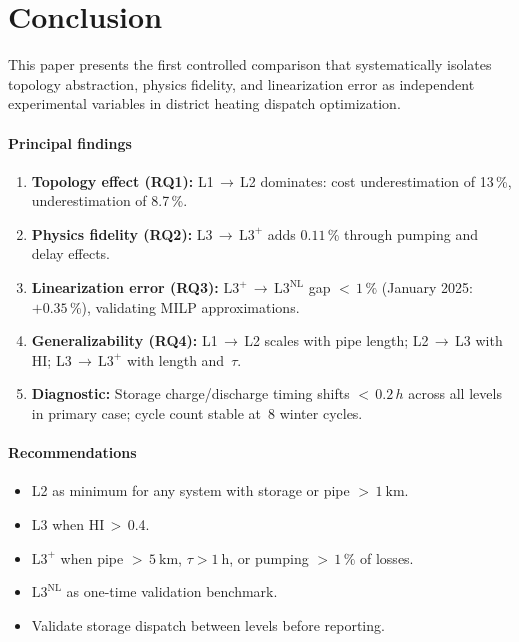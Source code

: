 \documentclass[review,3p]{elsarticle}
\newcommand{\Lplus}{\mathrm{L3}^{+}}
\newcommand{\Lnl}{\mathrm{L3}^{\mathrm{NL}}}
\begin{document}
\section{Conclusion}
\label{sec:conclusion}

This paper presents the first controlled comparison that
systematically isolates topology abstraction, physics fidelity, and
linearization error as independent experimental variables in district
heating dispatch optimization.

\paragraph{Principal findings}
\begin{enumerate}[nosep]
  \item \textbf{Topology effect (RQ1):} L1\,$\to$\,L2 dominates:
        cost underestimation of 13\,\%, 
        underestimation of 8.7\,\%.
  \item \textbf{Physics fidelity (RQ2):} L3\,$\to$\,$\Lplus$ adds
        $0.11$\,\% through pumping and delay effects.
  \item \textbf{Linearization error (RQ3):}
        $\Lplus$\,$\to$\,$\Lnl$ gap
        ${<}\,1\,\%$ (January 2025: $+0.35$\,\%), validating MILP approximations.
  \item \textbf{Generalizability (RQ4):} L1\,$\to$\,L2 scales with
        pipe length; L2\,$\to$\,L3 with HI; L3\,$\to$\,$\Lplus$ with
        length and~$\tau$.
  \item \textbf{Diagnostic:} Storage charge/discharge timing shifts
        ${<}\,0.2\,h$ across all levels in primary case; cycle count
        stable at~8 winter cycles.
\end{enumerate}

\paragraph{Recommendations}
\begin{itemize}[nosep]
  \item L2 as minimum for any system with storage or pipe
        ${>}\,\SI{1}{\kilo\metre}$.
  \item L3 when HI\,$>$\,0.4.
  \item $\Lplus$ when pipe ${>}\,\SI{5}{\kilo\metre}$,
        $\tau > \SI{1}{\hour}$, or pumping
        ${>}\,1\,\%$ of losses.
  \item $\Lnl$ as one-time validation benchmark.
  \item Validate storage dispatch between levels before reporting.
\end{itemize}
\end{document}
